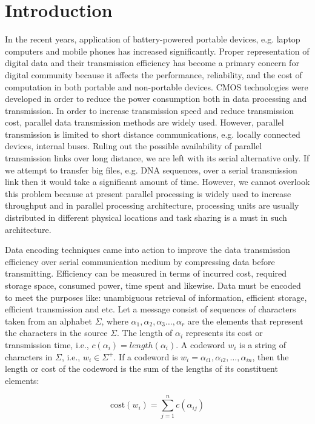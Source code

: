 \documentclass[preprint,12pt]{elsarticle}
\begin{document}
\section{Introduction}
In the recent years, application of battery-powered portable devices, e.g. laptop computers and mobile phones has increased significantly. Proper representation of digital data and their transmission efficiency has become a primary concern for digital community because it affects the performance, reliability, and the cost of computation in both portable and non-portable devices. CMOS technologies were developed in order to reduce the power consumption both in data processing and transmission. In order to increase transmission speed and reduce transmission cost, parallel data transmission methods are widely used. However, parallel transmission is limited to short distance communications, e.g. locally connected devices, internal buses. Ruling out the possible availability of parallel transmission links over long distance, we are left with its serial alternative only. If we attempt to transfer big files, e.g. DNA sequences, over a serial transmission link then it would take a significant amount of time. However, we cannot overlook this problem because at present parallel processing is widely used to increase throughput and in parallel processing architecture, processing units are usually distributed in different physical locations and task sharing is a must in such architecture.    

Data encoding techniques came into action to improve the data transmission efficiency over serial communication medium by compressing data before transmitting. Efficiency can be measured in terms of incurred cost, required storage space, consumed power, time spent and likewise. Data must be encoded to meet the purposes like: unambiguous retrieval of information, efficient storage, efficient transmission and etc. Let a message consist of sequences of characters taken from an alphabet $\Sigma$, where  $\alpha_1,\alpha_2,\alpha_3\ldots,\alpha_r$ are the elements that represent the characters in the source $\Sigma$. The length of $\alpha_i$ represents its cost or transmission time, i.e., $c\left(\alpha_i\right)= length(\alpha_i)$. A codeword $w_i$ is a string of characters in $\Sigma$, i.e., $w_i\in\Sigma^{+}$. If a codeword is $w_i=\alpha_{i1},\alpha_{i2},\ldots,\alpha_{in}$, then the length or cost of the codeword is the sum of the lengths of its constituent elements:

\begin{equation}
\label{eqn1}
  \text{cost}\left(w_i\right)=\sum_{j=1}^{n}c\left(\alpha_{ij}\right)
\end{equation} 
  
\end{document}
